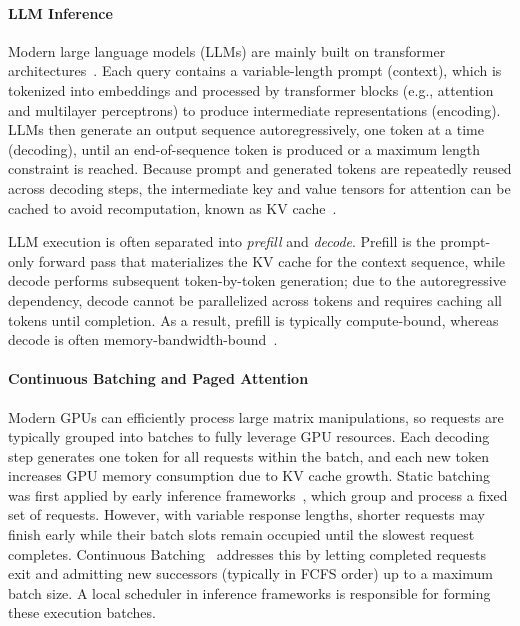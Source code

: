 \documentclass[sigconf, review, anonymous]{acmart}
\begin{document}
\paragraph{LLM Inference} Modern large language models (LLMs) are mainly built on transformer architectures~\cite{transformer}. Each query contains a variable-length prompt (context), which is tokenized into embeddings and processed by transformer blocks (e.g., attention and multilayer perceptrons) to produce intermediate representations (encoding). LLMs then generate an output sequence autoregressively, one token at a time (decoding), until an end-of-sequence token is produced or a maximum length constraint is reached. Because prompt and generated tokens are repeatedly reused across decoding steps, the intermediate key and value tensors for attention can be cached to avoid recomputation, known as KV cache~\cite{kang2024gearefficientkvcache}.

LLM execution is often separated into \emph{prefill} and \emph{decode}. Prefill is the prompt-only forward pass that materializes the KV cache for the context sequence, while decode performs subsequent token-by-token generation; due to the autoregressive dependency, decode cannot be parallelized across tokens and requires caching all tokens until completion. As a result, prefill is typically compute-bound, whereas decode is often memory-bandwidth-bound~\cite{podAttention}.

\paragraph{Continuous Batching and Paged Attention}

Modern GPUs can efficiently process large matrix manipulations, so requests are typically grouped into batches to fully leverage GPU resources. Each decoding step generates one token for all requests within the batch, and each new token increases GPU memory consumption due to KV cache growth. Static batching was first applied by early inference frameworks~\cite{lightseqhighperformanceinference, turbotransformersefficientgpuserving}, which group and process a fixed set of requests. However, with variable response lengths, shorter requests may finish early while their batch slots remain occupied until the slowest request completes. Continuous Batching~\cite{orca} addresses this by letting completed requests exit and admitting new successors (typically in FCFS order) up to a maximum batch size. A local scheduler in inference frameworks is responsible for forming these execution batches.
\end{document}
